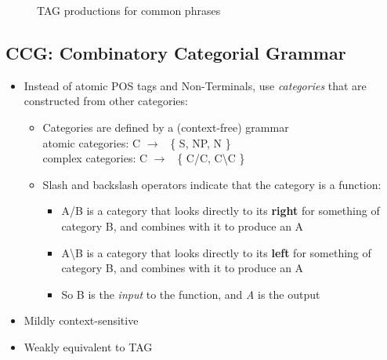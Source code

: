 \documentclass[11pt,letterpaper]{article}
\newcommand{\ra}{\ensuremath{\rightarrow}}
\newcommand{\bs}{\textbackslash}
\begin{document}
\begin{figure}[h]
  \centering
  \begin{subfigure}[b]{0.45\textwidth}
  \end{subfigure}
  \begin{subfigure}[b]{0.30\textwidth}
  \end{subfigure}%
  \caption{TAG productions for common phrases}
\end{figure}




\newpage
\subsection{CCG: Combinatory Categorial Grammar}

\begin{itemize}
  \item Instead of atomic POS tags and Non-Terminals, use \textit{categories} that are constructed from other categories:
	\begin{itemize}
	  \item Categories are defined by a (context-free) grammar \\
	        atomic categories: C \ra~ \{ S, NP, N \} \\
	        complex categories: C \ra~ \{ C/C, C\bs C \}
	  \item Slash and backslash operators indicate that the category is a function:
		\begin{itemize}
		  \item A/B is a category that looks directly to its \textbf{right} for something of category B, and combines with it to produce an A
		  \item A\bs B is a category that looks directly to its \textbf{left} for something of category B, and combines with it to produce an A
		  \item So B is the \textit{input} to the function, and \textit{A} is the output
		\end{itemize}
	\end{itemize}
  \item Mildly context-sensitive
  \item Weakly equivalent to TAG
\end{itemize}
\end{document}
